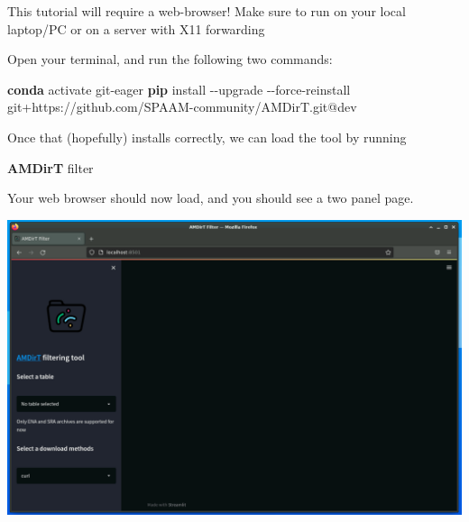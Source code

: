 \documentclass[
  letterpaper,
]{book}
\newenvironment{Shaded}{}{}
\newcommand{\AttributeTok}[1]{\textcolor[rgb]{0.84,0.23,0.29}{#1}}
\newcommand{\ExtensionTok}[1]{\textcolor[rgb]{0.84,0.23,0.29}{\textbf{#1}}}
\newcommand{\NormalTok}[1]{\textcolor[rgb]{0.14,0.16,0.18}{#1}}
\begin{document}
\begin{tcolorbox}[enhanced jigsaw, opacitybacktitle=0.6, bottomtitle=1mm, opacityback=0, colback=white, coltitle=black, leftrule=.75mm, toprule=.15mm, title=\textcolor{quarto-callout-warning-color}{\faExclamationTriangle}\hspace{0.5em}{Warning}, colframe=quarto-callout-warning-color-frame, toptitle=1mm, arc=.35mm, left=2mm, titlerule=0mm, breakable, rightrule=.15mm, bottomrule=.15mm, colbacktitle=quarto-callout-warning-color!10!white]

This tutorial will require a web-browser! Make sure to run on your local
laptop/PC or on a server with X11 forwarding

\end{tcolorbox}

Open your terminal, and run the following two commands:

\begin{Shaded}
\begin{Highlighting}[]
\ExtensionTok{conda}\NormalTok{ activate git{-}eager}
\ExtensionTok{pip}\NormalTok{ install }\AttributeTok{{-}{-}upgrade} \AttributeTok{{-}{-}force{-}reinstall}\NormalTok{ git+https://github.com/SPAAM{-}community/AMDirT.git@dev}
\end{Highlighting}
\end{Shaded}

Once that (hopefully) installs correctly, we can load the tool by
running

\begin{Shaded}
\begin{Highlighting}[]
\ExtensionTok{AMDirT}\NormalTok{ filter}
\end{Highlighting}
\end{Shaded}

Your web browser should now load, and you should see a two panel page.

\includegraphics{assets/images/chapters/introduction-to-ancientmetagenomedir/amdirt-firstpage.png}
\end{document}
